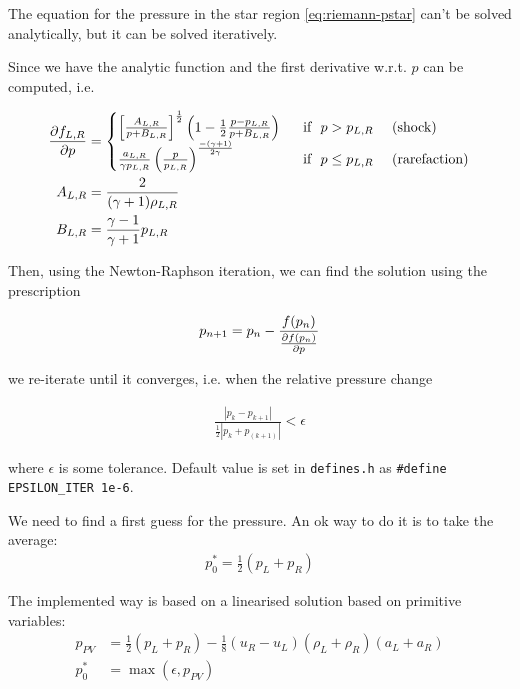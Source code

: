 The equation for the pressure in the star region \ref{eq:riemann-pstar} can't be solved analytically, but it can be solved iteratively.

Since we have the analytic function and the first derivative w.r.t. $p$ can be computed, i.e.

\begin{align*}
	\frac{\partial f_{L,R}}{\partial p} &= 
		\begin{cases}
			\left[ \frac{A_{L,R}}{p + B_{L,R}} \right]^{\frac{1}{2}} \left( 1 - \frac{1}{2} \frac{p - p_{L,R}}{p + B_{L,R}} \right) 
				& ~\text{ if } ~ p > p_{L,R} ~ \quad \text{(shock)} \\
			\frac{a_{L,R}}{\gamma p_{L,R}}  \left( \frac{p}{p_{L,R}} \right)^ \frac{-(\gamma+1)}{2 \gamma}
				& ~\text{ if } ~ p \leq p_{L,R} ~ \quad \text{(rarefaction)} \label{eq:riemann-pstar-dp}\\
		\end{cases} \\
	A_{L,R} &= 
		\frac{2}{(\gamma + 1) \rho_{L,R}}\\
	B_{L,R} &= 
		\frac{\gamma - 1}{\gamma + 1} p_{L,R}
\end{align*}


Then, using the Newton-Raphson iteration, we can find the solution using the prescription

\begin{align}
	p_{n+1} = p_n - \frac{f(p_n)}{\frac{\partial f(p_n)}{\partial p}}
\end{align}


we re-iterate until it converges, i.e. when the relative pressure change 

\begin{align}
	\frac{|p_k - p_{k+1}|}{\frac{1}{2} | p_k + p_(k+1) | } < \epsilon
\end{align}

where $\epsilon$ is some tolerance. Default value is set in \texttt{defines.h} as \verb|#define EPSILON_ITER 1e-6|.


We need to find a first guess for the pressure. 
An ok way to do it is to take the average:
\begin{align*}
	p_0^* = \frac{1}{2} (p_L + p_R)
\end{align*}

The implemented way is based on a linearised solution based on primitive variables:
\begin{align*}
	p_{PV} &= \frac{1}{2} (p_L + p_R) - \frac{1}{8} (u_R - u_L)(\rho_L + \rho_R)(a_L + a_R)\\
	p_0^* &= \max(\epsilon, p_{PV})
\end{align*}

